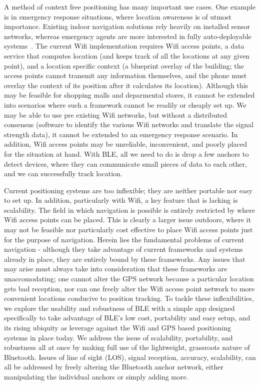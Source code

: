 \documentclass{sig-alternate}
\begin{document}
A method of context free positioning has many important use cases. 
One example is in emergency response situations, where location
awareness is of utmost importance. Existing indoor navigation
solutions rely heavily on installed sensor networks, whereas 
emergency agents are more interested in fully auto-deployable
systems~\cite{renaudin}. The current Wifi implementation
requires Wifi access points, a data service that computes location 
(and keeps track of all the locations at any given point), and a 
location specific context (a blueprint overlay of the building; the
access points cannot transmit any information themselves, and
the phone must overlay the context of its position after it calculates 
its location). Although this may be feasible for shopping malls and 
deparmental stores, it cannot be extended into scenarios where such 
a framework cannot be readily or  cheaply set up. We may be able to 
use pre existing Wifi networks, but without a distributed consensus 
(software to identify the various Wifi networks and translate the signal 
strength data), it cannot be extended to an emergency response 
scenario. In addition, Wifi access points may be unreliable, 
inconvenient, and poorly placed for the situation at hand. With BLE, 
all we need to do is drop a few anchors to detect devices, where
they can communicate small pieces of data to each other,
and we can successfully track location.

Current positioning systems are too inflexible; they are neither
portable nor easy to set up. In addition, particularly with Wifi,
a key feature that is lacking is scalability. The field in which navigation
is possible is entirely restricted by where Wifi access points can
be placed. This is clearly a larger issue outdoors, where it may not
be feasible nor particularly cost effective to place Wifi access points
just for the purpose of navigation. Herein lies the fundamental
problems of current navigation - although they take advantage of current 
frameworks and systems already in place, they are entirely bound
by these frameworks. Any issues that may arise must always take
into consideration that these frameworks are unaccomodating; one
cannot alter the GPS network because a particular location gets
bad reception, nor can one freely alter the Wifi access point network
to more convenient locations conducive to position tracking. To tackle 
these inflexibilities, we explore the usability and robustness of BLE 
with a simple app designed specifically to take advantage of BLE's low
cost, portability and easy setup, and its rising ubiquity as
leverage against the Wifi and GPS based positioning systems in 
place today. We address the issue of scalability, portability, and 
robustness all at once by making full use of the lightweight,
grassroots nature of Bluetooth. Issues of line of sight (LOS), signal
reception, accuracy, scalability, can all be addressed by freely
altering the Bluetooth anchor network, either manipulating the 
individual anchors or simply adding more.
\end{document}
